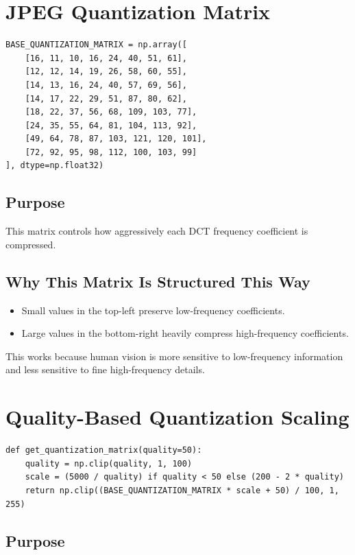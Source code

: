 \documentclass[12pt,a4paper]{article}
\begin{document}
\section{JPEG Quantization Matrix}

\begin{lstlisting}
BASE_QUANTIZATION_MATRIX = np.array([
    [16, 11, 10, 16, 24, 40, 51, 61],
    [12, 12, 14, 19, 26, 58, 60, 55],
    [14, 13, 16, 24, 40, 57, 69, 56],
    [14, 17, 22, 29, 51, 87, 80, 62],
    [18, 22, 37, 56, 68, 109, 103, 77],
    [24, 35, 55, 64, 81, 104, 113, 92],
    [49, 64, 78, 87, 103, 121, 120, 101],
    [72, 92, 95, 98, 112, 100, 103, 99]
], dtype=np.float32)
\end{lstlisting}

\subsection{Purpose}

This matrix controls how aggressively each DCT frequency coefficient is compressed.

\subsection{Why This Matrix Is Structured This Way}

\begin{itemize}
    \item Small values in the top-left preserve low-frequency coefficients.
    \item Large values in the bottom-right heavily compress high-frequency coefficients.
\end{itemize}

This works because human vision is more sensitive to low-frequency information and less sensitive to fine high-frequency details.

\section{Quality-Based Quantization Scaling}

\begin{lstlisting}
def get_quantization_matrix(quality=50):
    quality = np.clip(quality, 1, 100)
    scale = (5000 / quality) if quality < 50 else (200 - 2 * quality)
    return np.clip((BASE_QUANTIZATION_MATRIX * scale + 50) / 100, 1, 255)
\end{lstlisting}

\subsection{Purpose}
\end{document}
